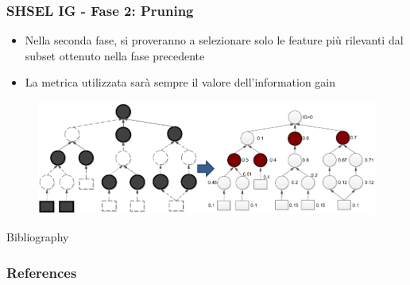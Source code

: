 \documentclass{beamer}
\begin{document}
\begin{frame}
	\frametitle{SHSEL IG - Fase 2: Pruning}
	\begin{itemize}
		\item Nella seconda fase, si proveranno a selezionare solo le feature più rilevanti dal subset ottenuto nella fase precedente
		\item La metrica utilizzata sarà sempre il valore dell'information gain
	\end{itemize}
	\begin{figure}[tbph]
		\centering
		\vspace{-0.2cm}
		\includegraphics[width=0.9\linewidth]{figure/Mannheim/SHSEL_Phase2.png}
		\label{fig:SHSELPhase2}
	\end{figure}
\end{frame}
\begin{frame}[allowframebreaks]{Bibliography}
	\frametitle{References}
	
	
\end{frame}
\end{document}
